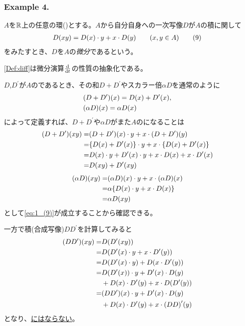\documentclass[../main]{subfiles}
\begin{document}
\subsubsection*{Example 4.}
\begin{definition}[微分]\label{Def:diff}
  $A$を$\mathbb{R}$上の任意の環({})とする。$A$から自分自身への一次写像$D$が$A$の積に関して
  \begin{align*}
    D(xy)=D(x)\cdot y+x\cdot D(y)\qq{}(x,y\in A)
    \tag{9}\label{eq:1_(9)}
  \end{align*}
  をみたすとき、$D$を$A$の\emph{微分}であるという。
\end{definition}

\begin{remark}
  \cref{Def:diff}は微分演算$\dv{t}$の性質の抽象化である。
\end{remark}

\begin{remark}
  $D$,$D^\prime$が$A$の{}であるとき、その和$D+D^\prime$やスカラー倍$\alpha D$を通常のように
  \begin{align*}
    &\qty(D+D^\prime)(x) = D(x)+D^\prime(x),\\
    &\qty(\alpha D)(x)=\alpha D(x)
  \end{align*}
  によって定義すれば、$D+D^\prime$や$\alpha D$がまた$A$の{}になることは
  \begin{align*}
    (D+D^\prime)(xy)=&(D+D^\prime)(x)\cdot y+x\cdot (D+D^\prime)(y)\\
    =&\qty{D(x)+D^\prime(x)}\cdot y+x\cdot\qty{D(x)+D^\prime(x)}\\
    =&D(x)\cdot y+D^\prime(x)\cdot y+x\cdot D(x)+x\cdot D^\prime(x)\\
    =&D(xy)+D^\prime(xy)
  \end{align*}
  \begin{align*}
    \qty(\alpha D)(xy) =& \qty(\alpha D)(x)\cdot y+x\cdot\qty(\alpha D)(x)\\
    =& \alpha \qty{D(x)\cdot y+x\cdot D(x)}\\
    =& \alpha D(xy)
  \end{align*}
  として\eqref{eq:1_(9)}が成立することから確認できる。

  一方で積(合成写像)$DD^\prime$を計算してみると
  \begin{align*}
    \qty(DD^\prime)(xy) =& D\qty(D^\prime(xy))\\
    =& D\qty(D^\prime(x)\cdot y+x\cdot D^\prime(y))\\
    =& D\qty(D^\prime(x)\cdot y) + D\qty(x\cdot D^\prime(y))\\
    =& D\qty(D^\prime(x))\cdot y + D^\prime(x)\cdot D(y)\\
    & +D(x)\cdot D^\prime(y)+ x\cdot D\qty(D^\prime(y))\\
    =& \qty(DD^\prime)(x)\cdot y + D^\prime(x)\cdot D(y)\\
    & +D(x)\cdot D^\prime(y)+ x\cdot \qty(DD)^\prime(y)
  \end{align*}
  となり、\underline{{}にはならない}。
\end{remark}
\end{document}
